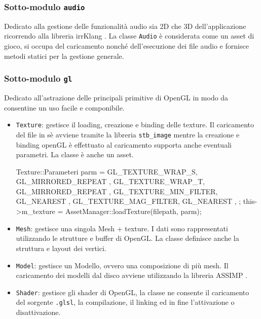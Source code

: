 \subsubsection{Sotto-modulo \texttt{audio}}
Dedicato alla gestione delle funzionalità audio sia 2D che 3D dell'{}applicazione ricorrendo alla libreria irrKlang \cite{IRRKLANG}. La classe \texttt{Audio} è considerata come un asset di gioco, si occupa del caricamento nonché dell'esecuzione dei file audio e fornisce metodi statici per la gestione generale.


\subsubsection{Sotto-modulo \texttt{gl}}
Dedicato all'astrazione delle principali primitive di OpenGL in modo da consentine un uso facile e componibile. 
\begin{itemize}
\item \texttt{Texture}: gestisce il loading, creazione e binding delle texture. Il caricamento del file in sè avviene tramite la libreria \texttt{stb\_image} \cite{STB} mentre la creazione e binding openGL è effettuato al caricamento supporta anche eventuali parametri. La classe è anche un asset.
\begin{cpp}
Texture::Parameteri parm = {
	{ GL_TEXTURE_WRAP_S, GL_MIRRORED_REPEAT },
	{ GL_TEXTURE_WRAP_T, GL_MIRRORED_REPEAT },
	{ GL_TEXTURE_MIN_FILTER, GL_NEAREST },
	{ GL_TEXTURE_MAG_FILTER, GL_NEAREST },
};
this->m_texture = AssetManager::loadTexture(filepath, parm);
\end{cpp}

\item \texttt{Mesh}: gestisce una singola Mesh + texture. I dati sono rappresentati utilizzando le strutture e buffer di OpenGL. La classe definisce anche la struttura e layout dei vertici.

\item \texttt{Model}: gestisce un Modello, ovvero una composizione di più mesh. Il caricamento dei modelli dal disco avviene utilizzando la libreria ASSIMP \cite{ASSIMP}.

\item \texttt{Shader}: gestisce gli shader di OpenGL, la classe ne consente il caricamento del sorgente \texttt{.glsl}, la compilazione, il linking ed in fine l'attivazione o disattivazione.
\end{itemize}

